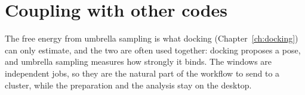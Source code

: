\section{Coupling with other codes}
The free energy from umbrella sampling is what docking (Chapter~\ref{ch:docking}) can only estimate, and the two are often used together: docking proposes a pose, and umbrella sampling measures how strongly it binds. The windows are independent jobs, so they are the natural part of the workflow to send to a cluster, while the preparation and the analysis stay on the desktop.
